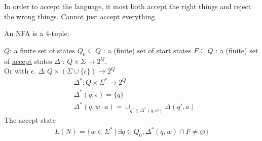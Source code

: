 \documentclass[class=scrartcl, crop=false]{standalone}
\begin{document}
\begin{note}
  In order to accept the language, it most both accept the right things and
  reject the wrong things. Cannot just accept everything.
\end{note}

\begin{definition}
  An NFA is a 4-tuple:
  \begin{enumerate}
    \ii $Q$: a finite set of states \ii $Q_0 \subseteq Q$ : a (finite) set of
    \ul{start} states \ii $F \subseteq Q$ : a (finite) set of \ul{accept} states
    \ii
    $\Delta$ :  $ Q \times \Sigma \to 2^Q$. \\
    Or with $\epsilon$. $\Delta : Q \times (\Sigma \cup \{\epsilon\}) \to 2^Q$
    \begin{align*} %
      &\Delta^* : Q \times \Sigma^* \to 2^Q \\
      &\Delta^*(q, \epsilon) = \{q\} \\
      &\Delta^* (q, w \cdot a) = \cup_{q' \in \Delta^*(q, w)}\Delta(q', a)
    \end{align*} 
    \ii The accept state
    \begin{gather*}
      L(N) = \{w \in \Sigma^* \ | \ \exists q \in Q_0, \Delta^*(q, w) \cap F \neq
      \varnothing\}
    \end{gather*}
  \end{enumerate}
  
\end{definition}
\end{document}
